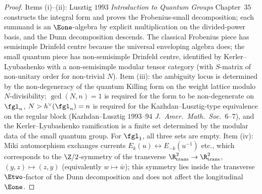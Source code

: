 \begin{proof}
Items (i)--(ii): Lusztig $1993$ \emph{Introduction to Quantum Groups} Chapter~$35$ constructs the integral form and proves the Frobenius-small decomposition; each summand is an $\Eone$-algebra by explicit multiplication on the divided-power basis, and the Dunn decomposition descends. The classical Frobenius piece has semisimple Drinfeld centre because the universal enveloping algebra does; the small quantum piece has non-semisimple Drinfeld centre, identified by Kerler--Lyubashenko with a non-semisimple modular tensor category (with $S$-matrix of non-unitary order for non-trivial $N$). Item (iii): the ambiguity locus is determined by the non-degeneracy of the quantum Killing form on the weight lattice modulo $N$-divisibility; $\gcd(N, n) = 1$ is required for the form to be non-degenerate on $\fgl_n$, $N > h^\vee(\fgl_n) = n$ is required for the Kazhdan--Lusztig-type equivalence on the regular block (Kazhdan--Lusztig $1993$--$94$ \emph{J.~Amer.~Math.~Soc.}~$6$--$7$), and the Kerler--Lyubashenko ramification is a finite set determined by the modular data of the small quantum group. For $\fgl_1$, all three sets are empty. Item (iv): Miki automorphism exchanges currents $E_k(u) \leftrightarrow E_{-k}(u^{-1})$ etc., which corresponds to the $\Z/2$-symmetry of the transverse $\R^2_{\mathrm{trans}} \to \R^2_{\mathrm{trans}}$, $(y, z) \mapsto (z, y)$ (equivalently $w \mapsto \bar w$); this symmetry lies inside the transverse $\Etwo$-factor of the Dunn decomposition and does not affect the longitudinal $\Eone$.
\end{proof}

